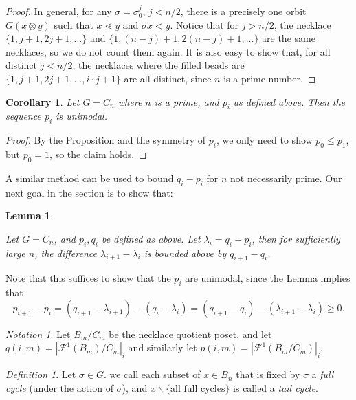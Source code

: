 \documentclass{amsart}
\newtheorem{cor}[thm]{Corollary}
\newtheorem{lem}[thm]{Lemma}
\theoremstyle{remark}
\newtheorem{defn}[thm]{Definition}
\newtheorem{note}[thm]{Notation}
\newcommand{\minus}{\backslash}
\begin{document}
\begin{proof}
  
In general, for any $\sigma = \sigma_0^{j}$, $j < n/2$, there is a precisely one orbit $G(x \otimes y)$ such that $x \lessdot y$ and $\sigma x < y$.  Notice that for $j > n/2$, the necklace $\{1, j+1,2j+1, ...  \}$ and $\{1, (n-j)+1, 2(n-j)+1, ... \}$ are the same necklaces, so we do not count them again. It is also easy to show that, for all distinct $j < n/2$, the necklaces where the filled beads are $\{1, j+1, 2j+1, ..., i\cdot j+1\}$ are all distinct, since $n$ is a prime number. 
\end{proof}

\begin{cor}{\label{cor:cyclic_prime_unimodal}} Let $G = C_n$ where $n$ is a prime, and $p_i$ as defined above. Then the sequence $p_i$ is unimodal. 
\end{cor}

\begin{proof}
By the Proposition and the symmetry of $p_i$, we only need to show $p_0 \le p_1$, but $p_0 = 1$, so the claim holds.
\end{proof}

A similar method can be used to bound $q_i - p_i$ for $n$ not necessarily prime.  Our next goal in the section is to show that:

\begin{lem}{\label{lem:cyclicgeneral}}

Let $G = C_n$, and $p_i, q_i$ be defined as above. Let $\lambda_i = q_i - p_i$, then for sufficiently large $n$, the difference $\lambda_{i+1} - \lambda_{i}$ is bounded above by  $q_{i+1} - q_i$. \end{lem}

Note that this suffices to show that the $p_i$ are unimodal, since the Lemma implies that
$$p_{i+1} - p_{i} = (q_{i+1} - \lambda_{i+1}) - (q_i - \lambda_i) = (q_{i+1} - q_i) - (\lambda_{i+1}- \lambda_i) \ge 0.$$ 

\begin{note} Let $B_m/C_m$ be the necklace quotient poset, and let $q (i, m) = |\mathcal F^1 (B_m)/C_m|_{i}$ and similarly let $p (i, m) = |\mathcal F^1 (B_m/C_m)|_{i}$.
\end{note}

\begin{defn}
Let  $\sigma \in G.$ we call each subset of $x \in B_n$ that is fixed by $\sigma$ a \textit{full cycle} (under the action of $\sigma$), and $x \minus \{\text{all full cycles}\}$ is called a \textit{tail cycle}.  
\end{defn}
\end{document}
